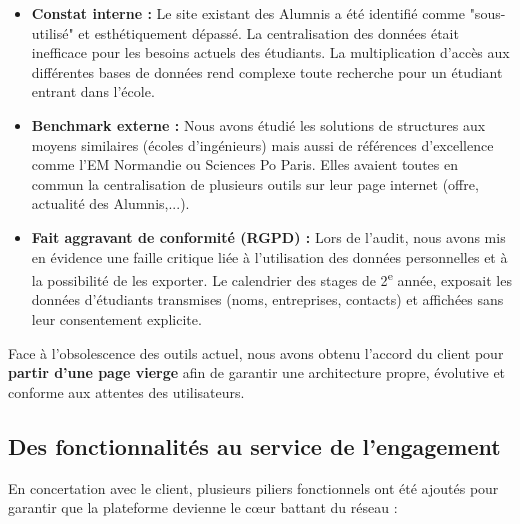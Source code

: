 \documentclass[a4paper,12pt]{article}
\begin{document}
\begin{itemize}[label=\textbullet, itemsep=5pt]
    \item \textbf{Constat interne :} Le site existant des Alumnis a été identifié comme "sous-utilisé" et esthétiquement dépassé. La centralisation des données était inefficace pour les besoins actuels des étudiants. La multiplication d’accès aux différentes bases de données rend complexe toute recherche pour un étudiant entrant dans l’école.
    \item \textbf{Benchmark externe :} Nous avons étudié les solutions de structures aux moyens similaires (écoles d'ingénieurs) mais aussi de références d'excellence comme l'EM Normandie ou Sciences Po Paris. Elles avaient toutes en commun la centralisation de plusieurs outils sur leur page internet (offre, actualité des Alumnis,...).
    \item \textbf{Fait aggravant de conformité (RGPD) :} Lors de l'audit, nous avons mis en évidence une faille critique liée à l'utilisation des données personnelles et à la possibilité de les exporter. Le calendrier des stages de 2\textsuperscript{e} année, exposait les données d'étudiants transmises (noms, entreprises, contacts) et affichées sans leur consentement explicite.    
\end{itemize}

Face à l'obsolescence des outils actuel, nous avons obtenu l'accord du client pour \textbf{partir d'une page vierge} afin de garantir une architecture propre, évolutive et conforme aux attentes des utilisateurs.

\subsection{Des fonctionnalités au service de l'engagement}
En concertation avec le client, plusieurs piliers fonctionnels ont été ajoutés pour garantir que la plateforme devienne le cœur battant du réseau :
\end{document}
